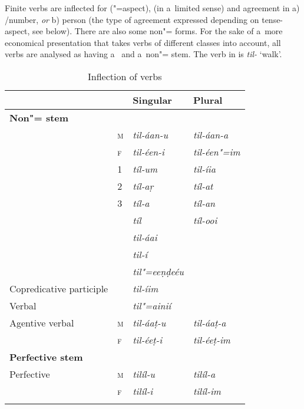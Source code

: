 Finite verbs are inflected for ("=aspect),  (in a~limited sense) and agreement in a)
/number, \textit{or} b) person (the type of agreement expressed depending on tense-aspect, see 
below). There are also some non"= forms. For the sake of a~more economical presentation that
takes verbs of different  classes into account, all verbs are analysed as having
a~ and a~non"= stem. The verb in  is \textit{til-} `walk'.


\begin{table}[ht]
\caption{Inflection of verbs}
\begin{tabularx}{\textwidth}{ l l Q Q }
\lsptoprule
&
&
Singular &
Plural \\\midrule
\textbf{Non"= stem} &
&
&
\\
 &
\textsc{m} &
\textit{til-áan-u} &
\textit{til-áan-a} \\
&
\textsc{f} &
\textit{til-éen-i} &
\textit{til-éen"=im} \\
 &
1 &
\textit{tíl-um} &
\textit{til-íia} \\
&
2 &
\textit{tíl-aṛ} &
\textit{tíl-at} \\
&
3 &
\textit{tíl-a} &
\textit{tíl-an} \\
 &
&
\textit{tíl} &
\textit{tíl-ooi} \\
 &
&
\textit{til-áai} &
\\
 &
&
\textit{til-í} &
\\
 &
&
\textit{til"=eeṇḍeéu} &
\\
Copredicative participle &
&
\textit{til-íim} &
\\
Verbal  &
&
\textit{til"=ainií} &
\\
Agentive verbal  &
\textsc{m} &
\textit{til-áaṭ-u} &
\textit{til-áaṭ-a} \\
&
\textsc{f} &
\textit{til-éeṭ-i} &
\textit{til-éeṭ-im} \\
\textbf{Perfective stem} &
&
&
\\
Perfective &
\textsc{m} &
\textit{tilíl-u} &
\textit{tilíl-a} \\
&
\textsc{f} &
\textit{tilíl-i} &
\textit{tilíl-im} \\\lspbottomrule
\end{tabularx}
\label{tab:2-verb}
\end{table}


